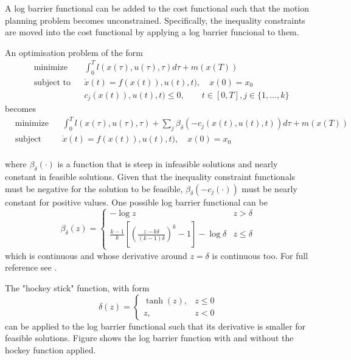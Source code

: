 \par A log barrier functional can be added to the cost functional such that the motion planning problem becomes unconstrained. Specifically, the inequality constraints are moved into the cost functional by applying a log barrier funcional to them.
\par An optimisation problem of the form 
\begin{equation}
    \label{eq:opt_prob_without_log_bar}
    \begin{aligned}
    & \text{minimize} && \int_0^T l(x(\tau),u(\tau),\tau)d\tau + m(x(T)) \\
    & \text{subject to}  && \dot{x}(t) = f(x(t)),u(t),t),\quad x(0)=x_0 \\
        & && c_j(x(t)),u(t),t)\leq 0, \qquad t\in [0,T],j\in \{1,\dots,k \}
    \end{aligned}
\end{equation}
becomes
\begin{equation}
    \label{eq:opt_prob_with_log_bar}
    \begin{aligned}
    & \text{minimize} && \int_0^T l(x(\tau),u(\tau),\tau)+\sum_j \beta_\delta(-c_j(x(t),u(t),t))d\tau + m(x(T)) \\
    & \text{subject to}  && \dot{x}(t) = f(x(t)),u(t),t),\quad x(0)=x_0 \\
    \end{aligned}
\end{equation}

where $\beta_\delta(\cdot)$ is a function that is steep in infeasible solutions and nearly constant in feasible solutions. Given that the inequality constraint functionals must be negative for the solution to be feasible, $\beta_\delta(-c_j(\cdot))$ must be nearly constant for positive values. One possible log barrier functional can be
\begin{equation}
    \beta_\delta (z) = 
    \begin{cases}
        -\log{} z & z>\delta \\
        \frac{k-1}{k}\left[\left(\frac{z-k\delta}{(k-1)\delta}\right)^k-1\right]-\log{}\delta & z\leq \delta
    \end{cases}
\end{equation}
which is continuous and whose derivative around $z=\delta$ is continuous too. For full reference see \cite{hauser2006barrier}.
\par The "hockey stick" function, with form
\begin{equation}
    \delta(z)= \begin{cases}
        \tanh(z), & z\leq 0 \\
        z, & z<0
    \end{cases}
\end{equation}
can be applied to the log barrier functional such that its derivative is smaller for feasible solutions. Figure  shows the log barrier function with and without the hockey function applied.

